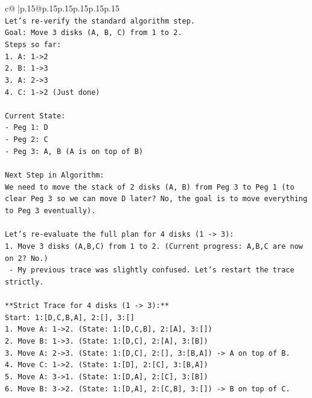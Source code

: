 \documentclass{article}
\begin{document}
{\begin{supertabular}{c@{$\;$}|p{.15\linewidth}@{}p{.15\linewidth}p{.15\linewidth}p{.15\linewidth}p{.15\linewidth}p{.15\linewidth}}
{{{\\ 
\texttt{Let's re{-}verify the standard algorithm step.} \\
\texttt{Goal: Move 3 disks (A, B, C) from 1 to 2.} \\
\texttt{Steps so far:} \\
\texttt{1. A: 1{-}>2} \\
\texttt{2. B: 1{-}>3} \\
\texttt{3. A: 2{-}>3} \\
\texttt{4. C: 1{-}>2 (Just done)} \\
\\ 
\texttt{Current State:} \\
\texttt{{-} Peg 1: D} \\
\texttt{{-} Peg 2: C} \\
\texttt{{-} Peg 3: A, B (A is on top of B)} \\
\\ 
\texttt{Next Step in Algorithm:} \\
\texttt{We need to move the stack of 2 disks (A, B) from Peg 3 to Peg 1 (to clear Peg 3 so we can move D later? No, the goal is to move everything to Peg 3 eventually).} \\
\\ 
\texttt{Let's re{-}evaluate the full plan for 4 disks (1 {-}> 3):} \\
\texttt{1. Move 3 disks (A,B,C) from 1 to 2. (Current progress: A,B,C are now on 2? No.)} \\
\texttt{   {-} My previous trace was slightly confused. Let's restart the trace strictly.} \\
\\ 
\texttt{**Strict Trace for 4 disks (1 {-}> 3):**} \\
\texttt{Start: 1:{[}D,C,B,A{]}, 2:{[}{]}, 3:{[}{]}} \\
\texttt{1. Move A: 1{-}>2. (State: 1:{[}D,C,B{]}, 2:{[}A{]}, 3:{[}{]})} \\
\texttt{2. Move B: 1{-}>3. (State: 1:{[}D,C{]}, 2:{[}A{]}, 3:{[}B{]})} \\
\texttt{3. Move A: 2{-}>3. (State: 1:{[}D,C{]}, 2:{[}{]}, 3:{[}B,A{]}) {-}> A on top of B.} \\
\texttt{4. Move C: 1{-}>2. (State: 1:{[}D{]}, 2:{[}C{]}, 3:{[}B,A{]})} \\
\texttt{5. Move A: 3{-}>1. (State: 1:{[}D,A{]}, 2:{[}C{]}, 3:{[}B{]})} \\
\texttt{6. Move B: 3{-}>2. (State: 1:{[}D,A{]}, 2:{[}C,B{]}, 3:{[}{]}) {-}> B on top of C.} \\
}}}
\end{supertabular}}
\end{document}
